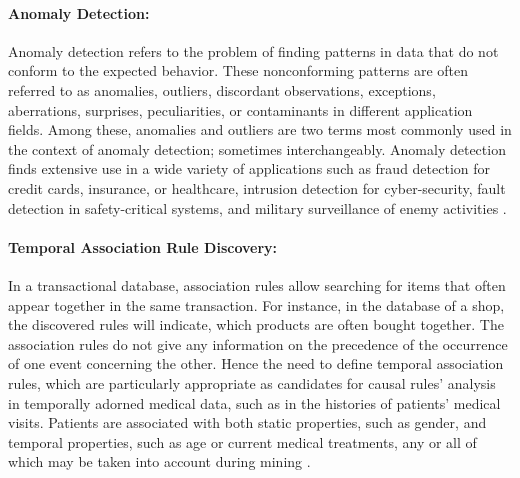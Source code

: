 \paragraph{Anomaly Detection:}
Anomaly detection refers to the problem of finding patterns in data that do not conform to the expected behavior. These nonconforming patterns are often referred to as anomalies, outliers, discordant observations, exceptions, aberrations, surprises, peculiarities, or contaminants in different application fields. Among these, anomalies and outliers are two terms  most commonly used in the context of anomaly detection; sometimes interchangeably. Anomaly detection finds extensive use in a wide variety of applications such as fraud detection for credit cards, insurance, or healthcare, intrusion detection for cyber-security, fault detection in safety-critical systems, and military surveillance of enemy activities \cite{chandola2009anomaly}.

\paragraph{Temporal Association Rule Discovery:}
In a transactional database, association rules allow searching for items that often appear together in the same transaction. For instance, in the database of a shop, the discovered rules will indicate, which products are often bought together. The association rules do not give any information on the precedence of the occurrence of one event concerning the other. Hence the need to define temporal association rules,  which are particularly appropriate as candidates for causal rules' analysis in temporally adorned medical data, such as in the histories of patients' medical visits. Patients are associated with both static properties, such as gender, and temporal properties, such as age or current medical treatments, any or all of which may be taken into account during mining \cite{Vasimalla2017}.

